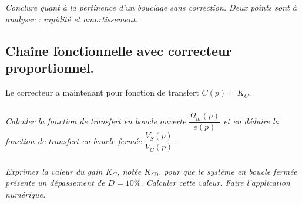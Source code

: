 \documentclass[11pt,oneside]{article}
\begin{document}
\subparagraph{}
\textit{Conclure quant à la pertinence d'un bouclage sans correction. Deux points sont à analyser : rapidité et amortissement.}


\subsection{Chaîne fonctionnelle avec correcteur proportionnel.}

Le correcteur a maintenant pour fonction de transfert $C(p) = K_C$.

\subparagraph{}
\textit{Calculer la fonction de transfert en boucle ouverte  $\dfrac{\Omega_m(p)}{e(p)}$ et en déduire la fonction de transfert en boucle fermée $\dfrac{V_S(p)}{V_C(p)}$.}


\subparagraph{}
\textit{Exprimer la valeur du gain $K_C$, notée $K_{C0}$, pour que le système en boucle fermée présente un dépassement de $D=10\%$. Calculer cette valeur. Faire l'application numérique. }

\end{document}
